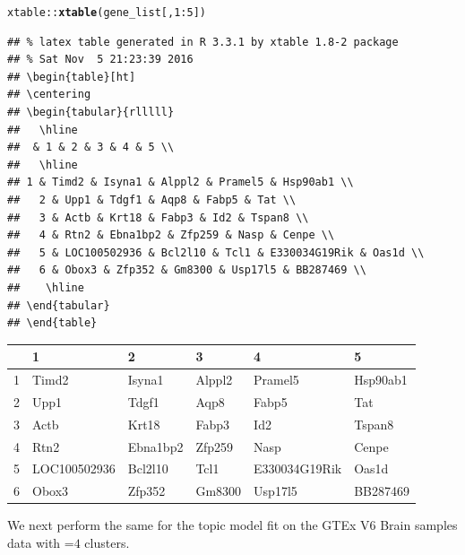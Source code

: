 \documentclass[12pt]{article}\usepackage[]{graphicx}\usepackage[usenames,dvipsnames]{color}
\makeatletter
\newcommand{\hlnum}[1]{\textcolor[rgb]{0.686,0.059,0.569}{#1}}%
\newcommand{\hlopt}[1]{\textcolor[rgb]{0,0,0}{#1}}%
\newcommand{\hlstd}[1]{\textcolor[rgb]{0.345,0.345,0.345}{#1}}%
\newcommand{\hlkwd}[1]{\textcolor[rgb]{0.737,0.353,0.396}{\textbf{#1}}}%
\newenvironment{kframe}{%
 \def\at@end@of@kframe{}%
 \ifinner\ifhmode%
  \def\at@end@of@kframe{\end{minipage}}%
  \begin{minipage}{\columnwidth}%
 \fi\fi%
 \def\FrameCommand##1{\hskip\@totalleftmargin \hskip-\fboxsep
 \colorbox{shadecolor}{##1}\hskip-\fboxsep
     \hskip-\linewidth \hskip-\@totalleftmargin \hskip\columnwidth}%
 \MakeFramed {\advance\hsize-\width
   \@totalleftmargin\z@ \linewidth\hsize
   \@setminipage}}%
 {\par\unskip\endMakeFramed%
 \at@end@of@kframe}
\newenvironment{knitrout}{}{} %
\makeatother
\begin{document}
\begin{knitrout}
\color{fgcolor}\begin{kframe}
\begin{alltt}
\hlstd{xtable}\hlopt{::}\hlkwd{xtable}\hlstd{(gene_list[,}\hlnum{1}\hlopt{:}\hlnum{5}\hlstd{])}
\end{alltt}
\begin{verbatim}
## % latex table generated in R 3.3.1 by xtable 1.8-2 package
## % Sat Nov  5 21:23:39 2016
## \begin{table}[ht]
## \centering
## \begin{tabular}{rlllll}
##   \hline
##  & 1 & 2 & 3 & 4 & 5 \\ 
##   \hline
## 1 & Timd2 & Isyna1 & Alppl2 & Pramel5 & Hsp90ab1 \\ 
##   2 & Upp1 & Tdgf1 & Aqp8 & Fabp5 & Tat \\ 
##   3 & Actb & Krt18 & Fabp3 & Id2 & Tspan8 \\ 
##   4 & Rtn2 & Ebna1bp2 & Zfp259 & Nasp & Cenpe \\ 
##   5 & LOC100502936 & Bcl2l10 & Tcl1 & E330034G19Rik & Oas1d \\ 
##   6 & Obox3 & Zfp352 & Gm8300 & Usp17l5 & BB287469 \\ 
##    \hline
## \end{tabular}
## \end{table}
\end{verbatim}
\end{kframe}
\end{knitrout}

\begin{table}[ht]
\centering
\begin{tabular}{rlllll}
  \hline
 & 1 & 2 & 3 & 4 & 5 \\
  \hline
1 & Timd2 & Isyna1 & Alppl2 & Pramel5 & Hsp90ab1 \\
  2 & Upp1 & Tdgf1 & Aqp8 & Fabp5 & Tat \\
  3 & Actb & Krt18 & Fabp3 & Id2 & Tspan8 \\
  4 & Rtn2 & Ebna1bp2 & Zfp259 & Nasp & Cenpe \\
  5 & LOC100502936 & Bcl2l10 & Tcl1 & E330034G19Rik & Oas1d \\
  6 & Obox3 & Zfp352 & Gm8300 & Usp17l5 & BB287469 \\
   \hline
\end{tabular}
\end{table}

We next perform the same for the topic model fit on the GTEx V6 Brain samples data with =$4$ clusters.
\end{document}
